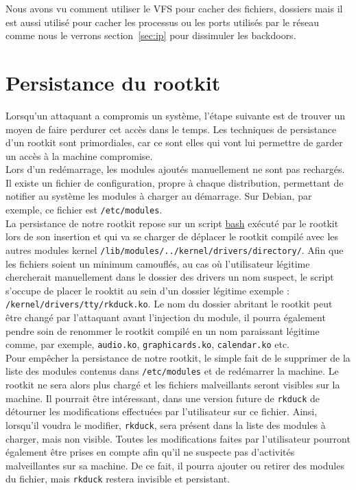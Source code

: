 \documentclass[12pt]{article}
\begin{document}
Nous avons vu comment utiliser le VFS pour cacher des fichiers, dossiers mais il est aussi utilisé pour cacher les processus ou les ports utilisés par le réseau comme nous le verrons section~\ref{sec:ip} pour dissimuler les backdoors.

\section{Persistance du rootkit}

    Lorsqu'un attaquant a compromis un système, l'étape suivante est de trouver un moyen de faire perdurer cet accès dans le temps. Les techniques de persistance d'un rootkit sont primordiales, car ce sont elles qui vont lui permettre de garder un accès à la machine compromise. \\ 

    Lors d'un redémarrage, les modules ajoutés manuellement ne sont pas rechargés. Il existe un fichier de configuration, propre à chaque distribution, permettant de notifier au système les modules à charger au démarrage. Sur Debian, par exemple, ce fichier est \texttt{/etc/modules}. \\

    La persistance de notre rootkit repose sur un script \href{https://github.com/QuokkaLight/rkduck/blob/master/forever.sh}{bash} exécuté par le rootkit lors de son insertion et qui va se charger de déplacer le rootkit compilé avec les autres modules kernel \texttt{/lib/modules/../kernel/drivers/directory/}. Afin que les fichiers soient un minimum camouflés, au cas où l'utilisateur légitime chercherait manuellement dans le dossier des drivers un nom suspect, le script s'occupe de placer le rooktit au sein d'un dossier légitime exemple : \texttt{/kernel/drivers/tty/rkduck.ko}. Le nom du dossier abritant le rootkit peut être changé par l'attaquant avant l'injection du module, il pourra également pendre soin de renommer le rootkit compilé en un nom paraissant légitime comme, par exemple, \texttt{audio.ko}, \texttt{graphicards.ko}, \texttt{calendar.ko} etc. \\

    Pour empêcher la persistance de notre rootkit, le simple fait de le supprimer de la liste des modules contenus dans \texttt{/etc/modules} et de redémarrer la machine. Le rootkit ne sera alors plus chargé et les fichiers malveillants seront visibles sur la machine. Il pourrait être intéressant, dans une version future de \texttt{rkduck} de détourner les modifications effectuées par l'utilisateur sur ce fichier. Ainsi, lorsqu'il voudra le modifier, \texttt{rkduck}, sera présent dans la liste des modules à charger, mais non visible. Toutes les modifications faites par l'utilisateur pourront également être prises en compte afin qu'il ne suspecte pas d'activités malveillantes sur sa machine. De ce fait, il pourra ajouter ou retirer des modules du fichier, mais \texttt{rkduck} restera invisible et persistant.
\end{document}
